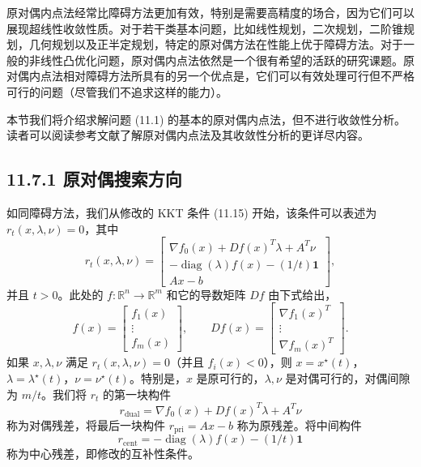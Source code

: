 \documentclass[UTF8,12pt,a4paper,fontset=fandol]{ctexart}
\begin{document}
原对偶内点法经常比障碍方法更加有效，特别是需要高精度的场合，因为它们可以展现超线性收敛性质。对于若干类基本问题，比如线性规划，二次规划，二阶锥规划，几何规划以及正半定规划，特定的原对偶方法在性能上优于障碍方法。对于一般的非线性凸优化问题，原对偶内点法依然是一个很有希望的活跃的研究课题。原对偶内点法相对障碍方法所具有的另一个优点是，它们可以有效处理可行但不严格可行的问题（尽管我们不追求这样的能力）。

本节我们将介绍求解问题 (11.1) 的基本的原对偶内点法，但不进行收敛性分析。读者可以阅读参考文献了解原对偶内点法及其收敛性分析的更详尽内容。

\subsection*{11.7.1 原对偶搜索方向}

如同障碍方法，我们从修改的 KKT 条件 (11.15) 开始，该条件可以表述为 $r_t(x,\lambda,\nu)=0$，其中
\begin{equation}
r_t(x,\lambda,\nu)=
\begin{bmatrix}
\nabla f_0(x)+Df(x)^T\lambda+A^T\nu\\
-\operatorname{diag}(\lambda)f(x)-(1/t)\mathbf{1}\\
Ax-b
\end{bmatrix},
\tag{11.53}
\end{equation}
并且 $t>0$。此处的 $f:\mathbb{R}^n\to\mathbb{R}^m$ 和它的导数矩阵 $Df$ 由下式给出，
\[
f(x)=
\begin{bmatrix}
f_1(x)\\
\vdots\\
f_m(x)
\end{bmatrix},\qquad
Df(x)=
\begin{bmatrix}
\nabla f_1(x)^T\\
\vdots\\
\nabla f_m(x)^T
\end{bmatrix}.
\]
如果 $x,\lambda,\nu$ 满足 $r_t(x,\lambda,\nu)=0$（并且 $f_i(x)<0$），则 $x=x^\star(t)$，$\lambda=\lambda^\star(t)$，$\nu=\nu^\star(t)$。特别是，$x$ 是原可行的，$\lambda,\nu$ 是对偶可行的，对偶间隙为 $m/t$。我们将 $r_t$ 的第一块构件
\[
r_{\mathrm{dual}}=\nabla f_0(x)+Df(x)^T\lambda+A^T\nu
\]
称为对偶残差，将最后一块构件 $r_{\mathrm{pri}}=Ax-b$ 称为原残差。将中间构件
\[
r_{\mathrm{cent}}=-\operatorname{diag}(\lambda)f(x)-(1/t)\mathbf{1}
\]
称为中心残差，即修改的互补性条件。
\end{document}
